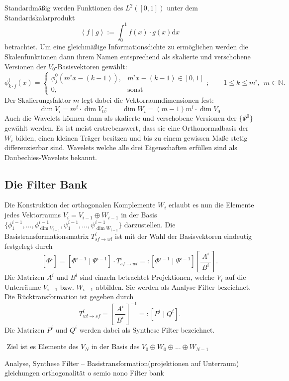 Standardmäßig werden Funktionen des $L^2([0,1])$ unter dem Standardskalarprodukt\begin{equation*}
\left\langle f\mid g\right\rangle :=\int_{0}^{1}f(x)\cdot g(x)\mathrm{d}x
\end{equation*}betrachtet. Um eine gleichmäßige Informationsdichte zu ermöglichen werden die Skalenfunktionen dann ihrem Namen entsprechend als skalierte und verschobene Versionen der $V_0$-Basisvektoren gewählt:\begin{equation*}
\phi^i_{k\cdot j}(x)=\begin{cases}
\phi^0_j(m^i x-(k-1)),&m^i x-(k-1)\in[0,1]\\
0, &\mathrm{sonst}
\end{cases};\qquad 1\leq k\leq m^i, \ \ m\in \mathbb{N}.
\end{equation*}Der Skalierungsfaktor $m$ legt dabei die Vektorraumdimensionen fest:\begin{equation*}
\dim V_i=m^i\cdot \dim V_0;\qquad\dim W_i=(m-1)m^i\cdot \dim V_0
\end{equation*}Auch die Wavelets können dann als skalierte und verschobene Versionen der $\{\Psi^0\}$ gewählt werden. Es ist meist erstrebenswert, dass sie eine Orthonormalbasis der $W_i$ bilden, einen kleinen Träger besitzen und bis zu einem gewissen Maße stetig differenzierbar sind. Wavelets welche alle drei Eigenschaften erfüllen sind als Daubechies-Wavelets bekannt.

\subsection{Die Filter Bank}
Die Konstruktion der orthogonalen Komplemente $W_i$ erlaubt es nun die Elemente jedes Vektorraums $V_i=V_{i-1}\oplus W_{i-1}$ in der Basis $\{\phi^{i-1}_1, ..., \phi^{i-1}_{\dim V_{i-1}}, \psi^{i-1}_1, ..., \psi^{i-1}_{\dim W_{i-1}}\}$ darzustellen. Die Basistransformationsmatrix $T^i_{sf\rightarrow wl}$ ist mit der Wahl der Basisvektoren eindeutig festgelegt durch\begin{equation*}
\left[ \Phi^i\right] =\left[ \Phi^{i-1}\mid \Psi^{i-1}\right] \cdot T^i_{sf\rightarrow wl}=:\left[ \Phi^{i-1}\mid \Psi^{i-1}\right]\left[ \frac{\ A^i\ }{\ B^i\ }\right].
\end{equation*}Die Matrizen $A^i$ und $B^i$ sind einzeln betrachtet Projektionen, welche $V_i$ auf die Unterräume $V_{i-1}$ bzw. $W_{i-1}$ abbilden. Sie werden als Analyse-Filter bezeichnet. Die Rücktransformation ist gegeben durch\begin{equation*}
T^i_{wl\rightarrow sf}=\left[ \frac{\ A^i\ }{\ B^i\ }\right]^{-1}=:\left[ P^i\mid Q^i\right].
\end{equation*}Die Matrizen $P^i$ und $Q^i$ werden dabei als Synthese Filter bezeichnet.










\newpage

$ $
Ziel ist es Elemente des $V_N$ in der Basis des $V_0\oplus W_0 \oplus...\oplus W_{N-1}$










\newpage

Analyse, Synthese Filter -- Basistransformation(projektionen auf Unterraum)
gleichungen orthogonalität o semio nono
Filter bank